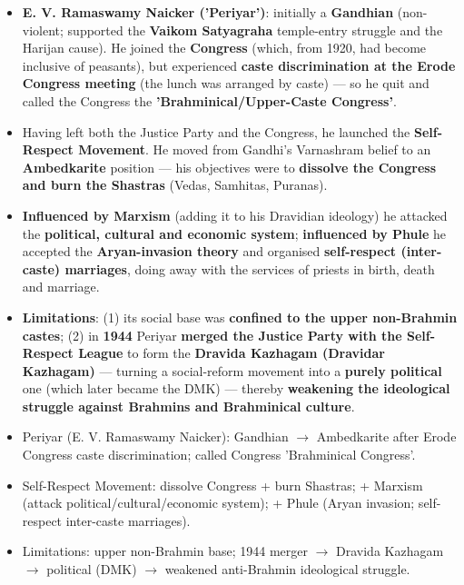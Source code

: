 \begin{KeyConcept}
\begin{itemize}
\item \textbf{E. V. Ramaswamy Naicker ('Periyar')}: initially a \textbf{Gandhian} (non-violent; supported the \textbf{Vaikom Satyagraha} temple-entry struggle and the Harijan cause). He joined the \textbf{Congress} (which, from 1920, had become inclusive of peasants), but experienced \textbf{caste discrimination at the Erode Congress meeting} (the lunch was arranged by caste) --- so he quit and called the Congress the \textbf{'Brahminical/Upper-Caste Congress'}.
\item Having left both the Justice Party and the Congress, he launched the \textbf{Self-Respect Movement}. He moved from Gandhi's Varnashram belief to an \textbf{Ambedkarite} position --- his objectives were to \textbf{dissolve the Congress and burn the Shastras} (Vedas, Samhitas, Puranas).
\item \textbf{Influenced by Marxism} (adding it to his Dravidian ideology) he attacked the \textbf{political, cultural and economic system}; \textbf{influenced by Phule} he accepted the \textbf{Aryan-invasion theory} and organised \textbf{self-respect (inter-caste) marriages}, doing away with the services of priests in birth, death and marriage.
\item \textbf{Limitations}: (1) its social base was \textbf{confined to the upper non-Brahmin castes}; (2) in \textbf{1944} Periyar \textbf{merged the Justice Party with the Self-Respect League} to form the \textbf{Dravida Kazhagam (Dravidar Kazhagam)} --- turning a social-reform movement into a \textbf{purely political} one (which later became the DMK) --- thereby \textbf{weakening the ideological struggle against Brahmins and Brahminical culture}.
\end{itemize}
\end{KeyConcept}

\begin{QuickRevision}
\begin{itemize}
\item Periyar (E. V. Ramaswamy Naicker): Gandhian $\rightarrow$ Ambedkarite after Erode Congress caste discrimination; called Congress 'Brahminical Congress'.
\item Self-Respect Movement: dissolve Congress + burn Shastras; + Marxism (attack political/cultural/economic system); + Phule (Aryan invasion; self-respect inter-caste marriages).
\item Limitations: upper non-Brahmin base; 1944 merger $\rightarrow$ Dravida Kazhagam $\rightarrow$ political (DMK) $\rightarrow$ weakened anti-Brahmin ideological struggle.
\end{itemize}
\end{QuickRevision}

